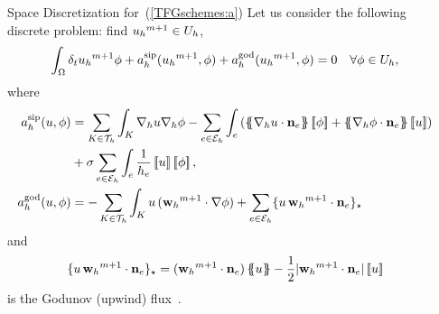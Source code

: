 \documentclass[final]{beamer}
\newlength{\sepwid}
\newlength{\onecolwid}
\begin{document}
\begin{frame}[t]
\begin{columns}[t]
\begin{column}{\onecolwid}
\begin{block}{Space Discretization for~(\ref{TFGschemes:a})}
        Let us consider the following discrete problem: find
        ${{u_{h}}^{m+1}}\in U_h$,
        \begin{equation}
          \label{discrete_problem_u}
          \int_\Omega \delta_t{{u_{h}}^{m+1}} \phi + a_h^{\mathrm{sip}}({{u_{h}}^{m+1}},\phi) + a_h^{\mathrm{god}}({{u_{h}}^{m+1}},\phi)=0 \quad \forall\phi\in U_h,
        \end{equation}
        where
        \begin{align*}
          \asip(u,\phi) &= \sum_{K\in\mathcal{T}_h}\int_K\nabla_h u\nabla_h \phi-\sum_{e\in\mathcal{E}_h}\int_e\left(\average{\nabla_h u\cdot\mathbf{n}_e}\jump{\phi}+\average{\nabla_h \phi\cdot\mathbf{n}_e}\jump{u}\right)\\&+\sigma\sum_{e\in\mathcal{E}_h}\int_e\frac{1}{h_e}\jump{u}\jump{\phi},
          \\
          \agod(u,\phi) &= -\sum_{K \in\mathcal{T}_h} \int_K u \, (\wwmm\cdot \grad\phi)
                          + \sum_{e\in\Eh}\{ u \, \wwmm \cdot \nn_e\}_\star
        \end{align*}
        and
        $$
        \{ u \, {{\mathbf{w}_{h}}^{m+1}} \cdot \mathbf{n}_e\}_\star=({{\mathbf{w}_{h}}^{m+1}}\cdot \mathbf{n}_e)\left\{\!\!\left\{u\right\}\!\!\right\} -\frac{1}{2}|{{\mathbf{w}_{h}}^{m+1}}\cdot\mathbf{n}_e|\left[\!\left[u\right]\!\right]
        $$
        is the Godunov (upwind) flux~\cite{anderson_high-order_2017}.

      \end{block}

    \end{column}



    \begin{column}{\sepwid}  \end{column}

    \vspace*{0.5cm}


\end{columns}
\end{frame}
\end{document}
